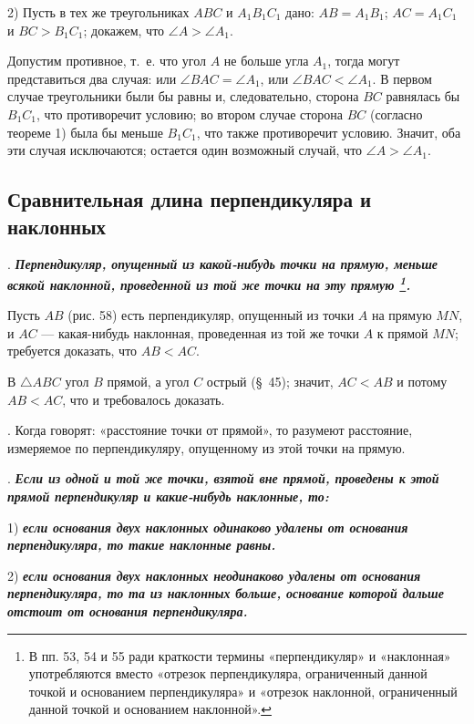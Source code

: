 \documentclass[oneside]{book}
\begin{document}
2) Пусть в тех же треугольниках $ABC$ и $A_1B_1C_1$ дано:
$AB=A_1B_1$;
$AC=A_1C_1$ и $BC>B_1C_1$;
докажем, что $\angle A > \angle A_1$.

Допустим противное, т.~е. что угол $A$ не больше угла $A_1$, тогда могут представиться два случая:
или $\angle BAC = \angle A_1$, или $\angle BAC < \angle A_1$.
В первом случае треугольники были бы равны и, следовательно, сторона $BC$ равнялась бы $B_1C_1$, что противоречит условию;
во втором случае сторона $BC$ (согласно теореме 1) была бы меньше $B_1C_1$, что также противоречит условию.
Значит, оба эти случая исключаются;
остается один возможный случай, что $\angle A > \angle A_1$.


\subsection*{Сравнительная длина перпендикуляра и наклонных}


.
\textbf{\emph{Перпендикуляр, опущенный из какой-нибудь точки на прямую, меньше всякой наклонной, проведенной из той же точки на эту прямую%
\footnote{В пп.
53, 54 и 55 ради краткости термины «перпендикуляр» и «наклонная» употребляются вместо «отрезок перпендикуляра, ограниченный данной точкой и основанием перпендикуляра» и «отрезок наклонной, ограниченный данной точкой и основанием наклонной».}.%
}}

Пусть $AB$ (рис. 58) есть перпендикуляр, опущенный из точки $A$ на прямую $MN$, и $AC$ — какая-нибудь наклонная, проведенная из той же точки $A$ к прямой $MN$;
требуется доказать, что $AB<AC$.

В $\triangle ABC$ угол $B$ прямой, а угол $C$ острый (§~45);
значит, $AC<AB$ и потому $AB<AC$, что и требовалось доказать.

.
Когда говорят:
«расстояние точки от прямой», то разумеют  расстояние, измеряемое по перпендикуляру, опущенному из этой точки на прямую.

.
\textbf{\emph{Если из одной и той же точки, взятой вне прямой, проведены к этой прямой перпендикуляр и какие-нибудь наклонные, то:}}

1) \textbf{\emph{если основания двух наклонных одинаково удалены от основания перпендикуляра, то такие наклонные равны.}}

2) \textbf{\emph{если основания двух наклонных неодинаково удалены от основания перпендикуляра, то та из наклонных больше, основание которой дальше отстоит от основания перпендикуляра.}}
\end{document}
